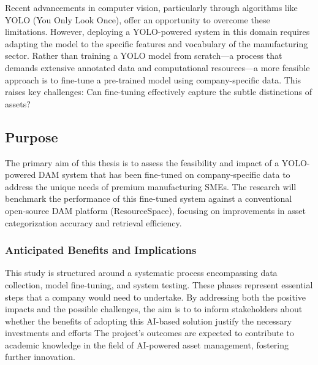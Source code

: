 \documentclass[a4paper,12pt,twocolumn]{article}
\numberwithin{figure}{section}
\numberwithin{table}{section}
\begin{document}
Recent advancements in computer vision, particularly through algorithms like YOLO (You Only Look Once), 
offer an opportunity to overcome these limitations. However, deploying a YOLO-powered system in this domain
 requires adapting the model to the specific features and vocabulary of the manufacturing sector. Rather than
  training a YOLO model from scratch—a process that demands extensive annotated data and computational resources—a 
  more feasible approach is to fine-tune a pre-trained model using company-specific data. This raises key challenges: 
  Can fine-tuning effectively capture the subtle distinctions of assets? 


\subsection{Purpose}

The primary aim of this thesis is to assess the feasibility and impact of a YOLO-powered DAM system 
that has been fine-tuned on company-specific data to address the unique needs of premium manufacturing SMEs. 
The research will benchmark the performance of this fine-tuned system against a conventional open-source DAM 
platform (ResourceSpace), focusing on improvements in asset categorization accuracy
and retrieval efficiency. 
\vspace{0.3cm}

\subsubsection{Anticipated Benefits and Implications}
\vspace{0.2cm}
This study is structured around a systematic process 
encompassing data collection, model fine-tuning, and system testing. 
These phases represent essential steps that a 
company would need to undertake. 
By addressing both the positive impacts and
the possible challenges, the aim is to
to inform stakeholders about whether the
benefits of adopting this AI-based solution
justify the necessary investments and efforts
The project’s outcomes are expected to contribute to 
academic knowledge in the field of AI-powered asset management, 
fostering further innovation. 
\end{document}
